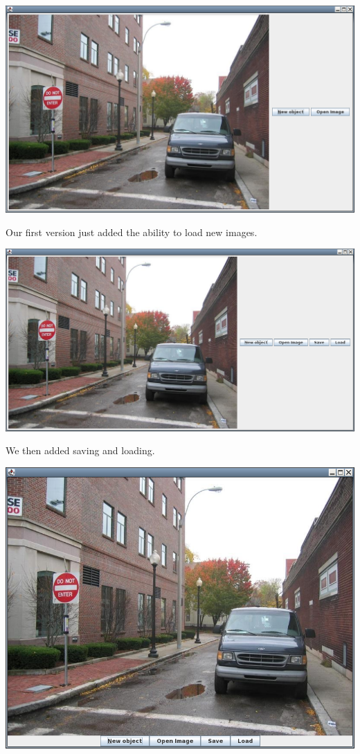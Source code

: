 \documentclass[a4paper,11pt,oneside]{article}
\begin{document}
\includegraphics[width=\textwidth]{old1.png}

Our first version just added the ability to load new images.

\includegraphics[width=\textwidth]{old2.png}

We then added saving and loading.

\includegraphics[width=\textwidth]{old3.png}
\end{document}
